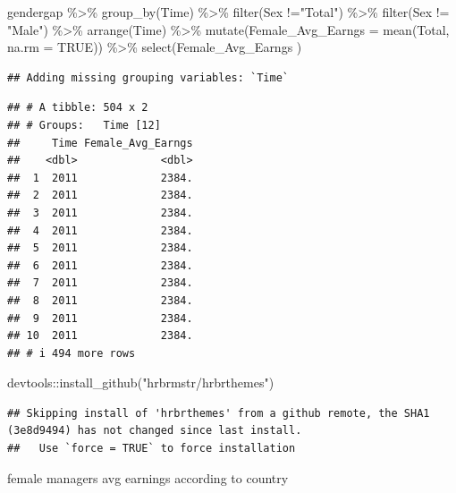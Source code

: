 \documentclass[
]{article}
\newenvironment{Shaded}{\begin{snugshade}}{\end{snugshade}}
\newcommand{\AttributeTok}[1]{\textcolor[rgb]{0.77,0.63,0.00}{#1}}
\newcommand{\ConstantTok}[1]{\textcolor[rgb]{0.00,0.00,0.00}{#1}}
\newcommand{\FunctionTok}[1]{\textcolor[rgb]{0.00,0.00,0.00}{#1}}
\newcommand{\NormalTok}[1]{#1}
\newcommand{\SpecialCharTok}[1]{\textcolor[rgb]{0.00,0.00,0.00}{#1}}
\newcommand{\StringTok}[1]{\textcolor[rgb]{0.31,0.60,0.02}{#1}}
\begin{document}
\begin{Shaded}
\begin{Highlighting}[]
\NormalTok{gendergap }\SpecialCharTok{\%\textgreater{}\%}
  \FunctionTok{group\_by}\NormalTok{(Time) }\SpecialCharTok{\%\textgreater{}\%}
  \FunctionTok{filter}\NormalTok{(Sex }\SpecialCharTok{!=}\StringTok{"Total"}\NormalTok{) }\SpecialCharTok{\%\textgreater{}\%}
  \FunctionTok{filter}\NormalTok{(Sex }\SpecialCharTok{!=} \StringTok{"Male"}\NormalTok{) }\SpecialCharTok{\%\textgreater{}\%}
  \FunctionTok{arrange}\NormalTok{(Time) }\SpecialCharTok{\%\textgreater{}\%}
  \FunctionTok{mutate}\NormalTok{(}\AttributeTok{Female\_Avg\_Earngs =} \FunctionTok{mean}\NormalTok{(Total, }\AttributeTok{na.rm =} \ConstantTok{TRUE}\NormalTok{)) }\SpecialCharTok{\%\textgreater{}\%}
  \FunctionTok{select}\NormalTok{(Female\_Avg\_Earngs )}
\end{Highlighting}
\end{Shaded}

\begin{verbatim}
## Adding missing grouping variables: `Time`
\end{verbatim}

\begin{verbatim}
## # A tibble: 504 x 2
## # Groups:   Time [12]
##     Time Female_Avg_Earngs
##    <dbl>             <dbl>
##  1  2011             2384.
##  2  2011             2384.
##  3  2011             2384.
##  4  2011             2384.
##  5  2011             2384.
##  6  2011             2384.
##  7  2011             2384.
##  8  2011             2384.
##  9  2011             2384.
## 10  2011             2384.
## # i 494 more rows
\end{verbatim}

\begin{Shaded}
\begin{Highlighting}[]
\NormalTok{devtools}\SpecialCharTok{::}\FunctionTok{install\_github}\NormalTok{(}\StringTok{"hrbrmstr/hrbrthemes"}\NormalTok{)}
\end{Highlighting}
\end{Shaded}

\begin{verbatim}
## Skipping install of 'hrbrthemes' from a github remote, the SHA1 (3e8d9494) has not changed since last install.
##   Use `force = TRUE` to force installation
\end{verbatim}

female managers avg earnings according to country
\end{document}
